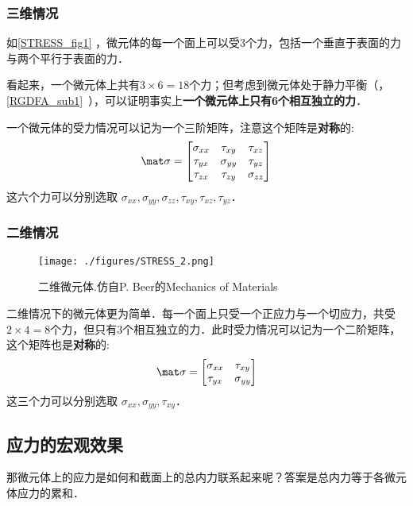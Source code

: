 \subsubsection{三维情况}
如\autoref{STRESS_fig1} ，微元体的每一个面上可以受3个力，包括一个垂直于表面的力与两个平行于表面的力．

看起来，一个微元体上共有$3\times6=18$个力；但考虑到微元体处于静力平衡（，\autoref{RGDFA_sub1}~），可以证明事实上\textbf{一个微元体上只有6个相互独立的力}．

一个微元体的受力情况可以记为一个三阶矩阵，注意这个矩阵是\textbf{对称}的:
\begin{equation}
\mat \sigma=
\begin{bmatrix}
\sigma_{xx} & \tau_{xy} & \tau_{xz} \\
\tau_{yx} & \sigma_{yy} & \tau_{yz} \\
\tau_{zx} & \tau_{zy} & \sigma_{zz} \\
\end{bmatrix}
\end{equation}
这六个力可以分别选取 $\sigma_{xx}, \sigma_{yy},\sigma_{zz}, \tau_{xy}, \tau_{xz},  \tau_{yz}$．

\subsubsection{二维情况}
\begin{figure}[ht]
\centering
\texttt{[image: ./figures/STRESS\_2.png]}
\caption{二维微元体.仿自P. Beer的Mechanics of Materials} \label{STRESS_fig2}
\end{figure}

二维情况下的微元体更为简单．每一个面上只受一个正应力与一个切应力，共受$2\times4=8$个力，但只有3个相互独立的力．此时受力情况可以记为一个二阶矩阵，这个矩阵也是\textbf{对称}的:
\begin{equation}
\mat \sigma=
\begin{bmatrix}
\sigma_{xx} & \tau_{xy}\\
\tau_{yx} & \sigma_{yy}\\
\end{bmatrix}
\end{equation}
这三个力可以分别选取 $\sigma_{xx}, \sigma_{yy}, \tau_{xy}$．

\subsection{应力的宏观效果}
那微元体上的应力是如何和截面上的总内力联系起来呢？答案是总内力等于各微元体应力的累和．

